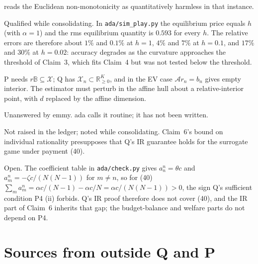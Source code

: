 \documentclass{article}
\begin{document}
\begin{objection}
 reads the Euclidean non-monotonicity as quantitatively harmless in that instance.
\end{objection}
Qualified while consolidating. In \texttt{ada/sim\_play.py} the equilibrium price equals \(h\) (with \(\alpha=1\)) and the rms equilibrium quantity is \(0.593\) for every \(h\). The relative errors are therefore about \(1\%\) and \(0.1\%\) at \(h=1\), \(4\%\) and \(7\%\) at \(h=0.1\), and \(17\%\) and \(30\%\) at \(h=0.02\): accuracy degrades as the curvature approaches the threshold of Claim~3, which fits Claim~4 but was not tested below the threshold.

\begin{objection}
P needs \(r\mathbb B\subseteq\mathcal X\); Q has \(\mathcal X_n\subset\mathbb R^K_{\ge0}\), and in the EV case \(\mathcal Ar_n=b_n\) gives empty interior. The estimator must perturb in the affine hull about a relative-interior point, with \(d\) replaced by the affine dimension. 
\end{objection}
Unanswered by emmy. ada calls it routine; it has not been written.

\begin{objection}
Not raised in the ledger; noted while consolidating. Claim~6's bound on individual rationality presupposes that Q's IR guarantee holds for the surrogate game under payment (40).
\end{objection}
Open. The coefficient table in \texttt{ada/check.py} gives \(a^n_n=\theta c\) and \(a^n_m=-\zeta c/(N(N-1))\) for \(m\neq n\), so for (40) \(\sum_ma^n_m=\alpha c/(N-1)-\alpha c/N=\alpha c/(N(N-1))>0\), the sign Q's sufficient condition P4 (ii) forbids. Q's IR proof therefore does not cover (40), and the IR part of Claim~6 inherits that gap; the budget-balance and welfare parts do not depend on P4.

\section{Sources from outside Q and P}
\end{document}
